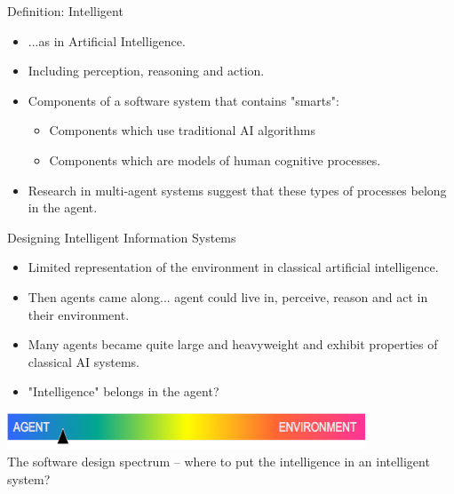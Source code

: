 \documentclass[aspectratio=1610,xcolor=dvipsnames,t]{beamer}
\begin{document}
\begin{frame}{Definition: Intelligent}
    \begin{itemize}
        \item ...as in Artificial Intelligence.
        \item Including perception, reasoning and action.
        \item Components of a software system that contains "smarts":
            \begin{itemize}
                \item Components which use traditional AI algorithms
                \item Components which are models of human cognitive 
                      processes.
            \end{itemize}
        \item Research in multi-agent systems suggest that these
              types of processes belong in the agent. 
    \end{itemize}
\end{frame} 

\begin{frame}{Designing Intelligent Information Systems} 
    \begin{itemize}
        \item Limited representation of the environment in classical
              artificial intelligence.
        \item Then agents came along... agent could live in,
              perceive, reason and act in their environment.
        \item Many agents became quite large and heavyweight and
              exhibit properties of classical AI systems.
        \item "Intelligence" belongs in the agent?
    \end{itemize}
    \begin{center}
        \includegraphics[width=0.8\textwidth]{intel-spectrum} \\
        The software design spectrum -- where to put the intelligence in an
        intelligent system?
    \end{center}
\end{frame}
\end{document}
